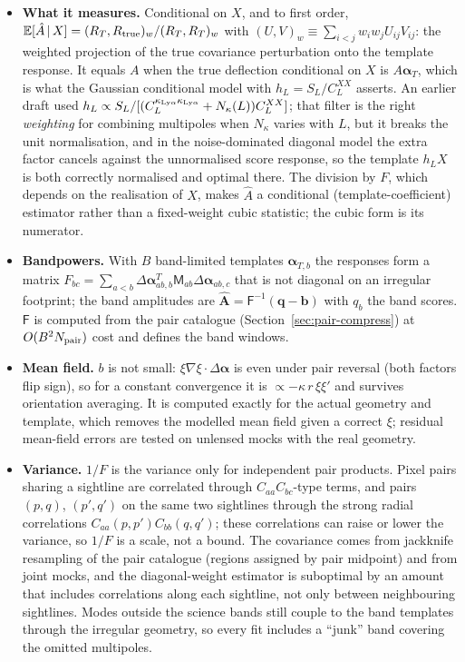 \documentclass[11pt,a4paper]{article}
\newcommand{\klya}{\kappa_{{\rm Ly}\alpha}}
\begin{document}
\begin{itemize}
\item \textbf{What it measures.} Conditional on $X$, and to first order, $\mathbb E[\hat A\,|\,X]=(R_T,R_{\rm true})_w/(R_T,R_T)_w$ with $(U,V)_w\equiv\sum_{i<j}w_iw_jU_{ij}V_{ij}$: the weighted projection of the true covariance perturbation onto the template response. It equals $A$ when the true deflection conditional on $X$ is $A\bm\alpha_T$, which is what the Gaussian conditional model with $h_L=S_L/C^{XX}_L$ asserts. An earlier draft used $h_L\propto S_L/[(C^{\klya\klya}_L+N_\kappa(L))C^{XX}_L]$; that filter is the right \emph{weighting} for combining multipoles when $N_\kappa$ varies with $L$, but it breaks the unit normalisation, and in the noise-dominated diagonal model the extra factor cancels against the unnormalised score response, so the template $h_LX$ is both correctly normalised and optimal there. The division by $F$, which depends on the realisation of $X$, makes $\hat A$ a conditional (template-coefficient) estimator rather than a fixed-weight cubic statistic; the cubic form is its numerator.
\item \textbf{Bandpowers.} With $B$ band-limited templates $\bm\alpha_{T,b}$ the responses form a matrix $F_{bc}=\sum_{a<b}\Delta\bm\alpha_{ab,b}^T\mathsf M_{ab}\Delta\bm\alpha_{ab,c}$ that is not diagonal on an irregular footprint; the band amplitudes are $\hat{\bm A}=\mathsf F^{-1}(\bm q-\bm b)$ with $q_b$ the band scores. $\mathsf F$ is computed from the pair catalogue (Section~\ref{sec:pair-compress}) at $O(B^2N_{\rm pair})$ cost and defines the band windows.
\item \textbf{Mean field.} $b$ is not small: $\xi\nabla\xi\cdot\Delta\bm\alpha$ is even under pair reversal (both factors flip sign), so for a constant convergence it is $\propto-\kappa\,r\,\xi\xi'$ and survives orientation averaging. It is computed exactly for the actual geometry and template, which removes the modelled mean field given a correct $\xi$; residual mean-field errors are tested on unlensed mocks with the real geometry.
\item \textbf{Variance.} $1/F$ is the variance only for independent pair products. Pixel pairs sharing a sightline are correlated through $C_{aa}C_{bc}$-type terms, and pairs $(p,q)$, $(p',q')$ on the same two sightlines through the strong radial correlations $C_{aa}(p,p')C_{bb}(q,q')$; these correlations can raise or lower the variance, so $1/F$ is a scale, not a bound. The covariance comes from jackknife resampling of the pair catalogue (regions assigned by pair midpoint) and from joint mocks, and the diagonal-weight estimator is suboptimal by an amount that includes correlations along each sightline, not only between neighbouring sightlines. Modes outside the science bands still couple to the band templates through the irregular geometry, so every fit includes a ``junk'' band covering the omitted multipoles.

\end{itemize}
\end{document}
